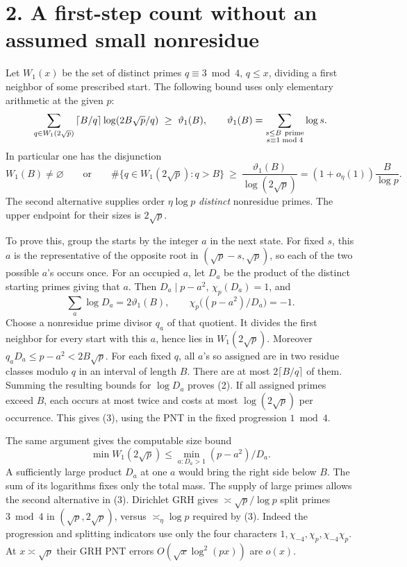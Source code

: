 \documentclass[11pt]{article}
\newcommand{\ch}{\chi_p}
\begin{document}
\newpage
\section*{2. A first-step count without an assumed small nonresidue}
Let \(W_1(x)\) be the set of distinct primes \(q\equiv3\bmod4\), \(q\le x\),
dividing a first neighbor of some prescribed start. The following bound uses
only elementary arithmetic at the given \(p\):
\begin{equation}
 \sum_{q\in W_1(2\sqrt p)}\left\lceil B/q\right\rceil
       \log(2B\sqrt p/q)\ \ge\
 \vartheta_1(B),\qquad
 \vartheta_1(B)=\sum_{\substack{s\le B\ {\rm prime}\\ s\equiv1\bmod4}}\log s .
\end{equation}
In particular one has the disjunction
\begin{equation}
 W_1(B)\ne\varnothing\qquad\text{or}\qquad
 \#\{q\in W_1(2\sqrt p):q>B\}
 \ \ge\ \frac{\vartheta_1(B)}{\log(2\sqrt p)}
 = (1+o_\eta(1))\frac{B}{\log p}.
\end{equation}
The second alternative supplies order \(\eta\log p\) \emph{distinct}
nonresidue primes. The upper endpoint for their sizes is \(2\sqrt p\).

To prove this, group the starts by the integer \(a\) in the next state.
For fixed \(s\), this \(a\) is the representative of the opposite root
in \((\sqrt p-s,\sqrt p)\), so each of the two possible \(a\)'s occurs once.
For an occupied \(a\), let \(D_a\) be the product of the distinct starting
primes giving that \(a\). Then \(D_a\mid p-a^2\),
\(\ch(D_a)=1\), and
\[
 \sum_a\log D_a=2\vartheta_1(B),\qquad
 \ch\big((p-a^2)/D_a\big)=-1 .
\]
Choose a nonresidue prime divisor \(q_a\) of that quotient. It divides
the first neighbor for every start with this \(a\), hence lies in
\(W_1(2\sqrt p)\). Moreover
\(q_aD_a\le p-a^2<2B\sqrt p\). For each fixed \(q\), all \(a\)'s so
assigned are in two residue classes modulo \(q\) in an interval of length
\(B\). There are at most \(2\lceil B/q\rceil\) of them. Summing the
resulting bounds for \(\log D_a\) proves (2). If all assigned primes exceed
\(B\), each occurs at most twice and costs at most \(\log(2\sqrt p)\) per
occurrence. This gives (3), using the PNT in the fixed progression \(1\bmod4\).

The same argument gives the computable size bound
\[
 \min W_1(2\sqrt p)\le \min_{a:D_a>1}(p-a^2)/D_a.
\]
A sufficiently large product \(D_a\) at one \(a\) would bring the right side
below \(B\). The sum of its logarithms fixes only the total mass.
The supply of large primes allows the second alternative in (3).
Dirichlet GRH gives \(\asymp\sqrt p/\log p\) split primes \(3\bmod4\)
in \((\sqrt p,2\sqrt p)\), versus \(\asymp_\eta\log p\) required by (3).
Indeed the progression and splitting indicators use only the four
characters \(1,\chi_{-4},\ch,\chi_{-4}\ch\). At \(x\asymp\sqrt p\)
their GRH PNT errors \(O(\sqrt x\log^2(px))\) are \(o(x)\).
\end{document}
